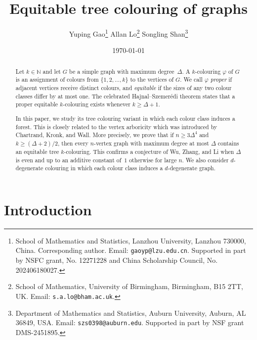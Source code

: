 \documentclass[11pt]{article}
\theoremstyle{plain}
\numberwithin{equation}{section}
\begin{document}
	\title{Equitable tree colouring of graphs}
	
	\author{Yuping Gao\footnote{School of Mathematics and Statistics, Lanzhou University, Lanzhou 730000, China.
			Corresponding author.
			Email: {\tt gaoyp@lzu.edu.cn}.
			Supported in part by  NSFC grant, No. 12271228 and China Scholarship Council, No. 202406180027.}
		\qquad
		Allan Lo\footnote{School of Mathematics, University of Birmingham, Birmingham, B15 2TT, UK. Email: {\tt s.a.lo@bham.ac.uk}.}
		\qquad
		Songling Shan\footnote{Department of Mathematics and Statistics, Auburn University, Auburn, AL 36849, USA.
			Email:	{\tt szs0398@auburn.edu}.
			Supported in part by NSF grant   DMS-2451895.
		}
	}
	
	\date{\today}
	\maketitle
	\begin{abstract}
		Let $k \in \mathbb{N}$ and let $G$ be a simple graph with maximum degree~$\Delta$.
		A $k$-colouring $\varphi$ of $G$ is an assignment of colours from $\{1,2,\ldots,k\}$ to the vertices of $G$.
		We call $\varphi$ \emph{proper} if adjacent vertices receive distinct colours, and  \emph{equitable} if the sizes of any two colour classes differ by at most one.
		The celebrated Hajnal--Szemer\'{e}di  theorem states that a proper equitable $k$-colouring exists whenever $k \ge \Delta + 1$.


		In this paper, we study its tree colouring variant  in which each colour class induces a forest.
		This is closely related to the vertex arboricity which was introduced by Chartrand, Kronk, and Wall.
		More precisely, we prove that if $n \ge 3\Delta^4$ and $k \ge (\Delta+2)/2$, then every $n$-vertex graph with maximum degree at most $\Delta$ contains an equitable tree $k$-colouring.
		This confirms a conjecture of Wu, Zhang, and Li when $\Delta$ is even and up to an additive constant of~$1$ otherwise for large $n$.
		We also consider $d$-degenerate colouring in which each colour class induces a $d$-degenerate graph.
		
\medskip
		
	\end{abstract}
	
	
	
	
	
\section{Introduction}\label{sec:introduction}
\end{document}
